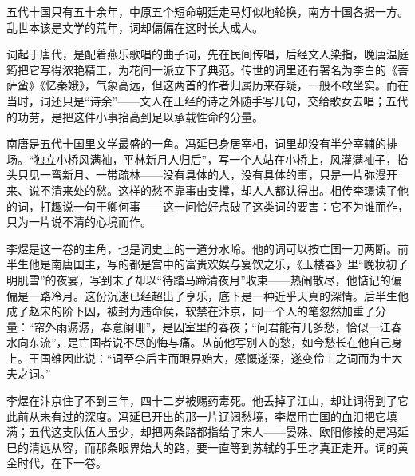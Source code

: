
\begin{intro}
五代十国只有五十余年，中原五个短命朝廷走马灯似地轮换，南方十国各据一方。乱世本该是文学的荒年，词却偏偏在这时长大成人。

词起于唐代，是配着燕乐歌唱的曲子词，先在民间传唱，后经文人染指，晚唐温庭筠把它写得浓艳精工，为花间一派立下了典范。传世的词里还有署名为李白的《菩萨蛮》《忆秦娥》，气象高远，但这两首的作者归属历来存疑，一般不敢坐实。而在当时，词还只是“诗余”——文人在正经的诗之外随手写几句，交给歌女去唱；五代的功劳，是把这件小事抬高到足以承载性命的分量。

南唐是五代十国里文学最盛的一角。冯延巳身居宰相，词里却没有半分宰辅的排场。“独立小桥风满袖，平林新月人归后”，写一个人站在小桥上，风灌满袖子，抬头只见一弯新月、一带疏林——没有具体的人，没有具体的事，只是一片弥漫开来、说不清来处的愁。这样的愁不靠事由支撑，却人人都认得出。相传李璟读了他的词，打趣说一句干卿何事——这一问恰好点破了这类词的要害：它不为谁而作，只为一片说不清的心境而作。

李煜是这一卷的主角，也是词史上的一道分水岭。他的词可以按亡国一刀两断。前半生他是南唐国主，写的都是宫中的富贵欢娱与宴饮之乐，《玉楼春》里“晚妆初了明肌雪”的夜宴，写到末了却以“待踏马蹄清夜月”收束——热闹散尽，他惦记的偏偏是一路冷月。这份沉迷已经超出了享乐，底下是一种近乎天真的深情。后半生他成了赵宋的阶下囚，被封为违命侯，软禁在汴京，同一个人的笔忽然加重了分量：“帘外雨潺潺，春意阑珊”，是囚室里的春夜；“问君能有几多愁，恰似一江春水向东流”，是亡国者说不尽的悔与痛。从前他写别人的愁，如今愁长在他自己身上。王国维因此说：“词至李后主而眼界始大，感慨遂深，遂变伶工之词而为士大夫之词。”

李煜在汴京住了不到三年，四十二岁被赐药毒死。他丢掉了江山，却让词得到了它此前从未有过的深度。冯延巳开出的那一片辽阔愁境，李煜用亡国的血泪把它填满；五代这支队伍人虽少，却把两条路都指给了宋人——晏殊、欧阳修接的是冯延巳的清远从容，而那条眼界始大的路，要一直等到苏轼的手里才真正走开。词的黄金时代，在下一卷。
\end{intro}
